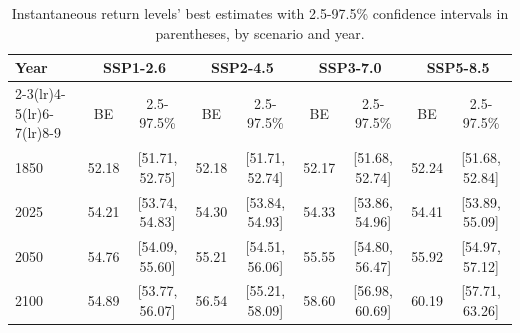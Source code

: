 \begin{table}[htbp]
\centering
\begin{tabular}{lcccccccc}
\toprule
Year & \multicolumn{2}{c}{\textbf{SSP1-2.6}} & \multicolumn{2}{c}{\textbf{SSP2-4.5}} & \multicolumn{2}{c}{\textbf{SSP3-7.0}} & \multicolumn{2}{c}{\textbf{SSP5-8.5}} \\
\cmidrule(lr){2-3}\cmidrule(lr){4-5}\cmidrule(lr){6-7}\cmidrule(lr){8-9}
 & BE & 2.5-97.5\% & BE & 2.5-97.5\% & BE & 2.5-97.5\% & BE & 2.5-97.5\% \\
\midrule
1850 & 52.18 & [51.71, 52.75] & 52.18 & [51.71, 52.74] & 52.17 & [51.68, 52.74] & 52.24 & [51.68, 52.84] \\
2025 & 54.21 & [53.74, 54.83] & 54.30 & [53.84, 54.93] & 54.33 & [53.86, 54.96] & 54.41 & [53.89, 55.09] \\
2050 & 54.76 & [54.09, 55.60] & 55.21 & [54.51, 56.06] & 55.55 & [54.80, 56.47] & 55.92 & [54.97, 57.12] \\
2100 & 54.89 & [53.77, 56.07] & 56.54 & [55.21, 58.09] & 58.60 & [56.98, 60.69] & 60.19 & [57.71, 63.26] \\
\bottomrule
\end{tabular}
\caption{Instantaneous return levels' best estimates with 2.5-97.5\% confidence intervals in parentheses, by scenario and year.}
\label{tab:scenarios}
\end{table}